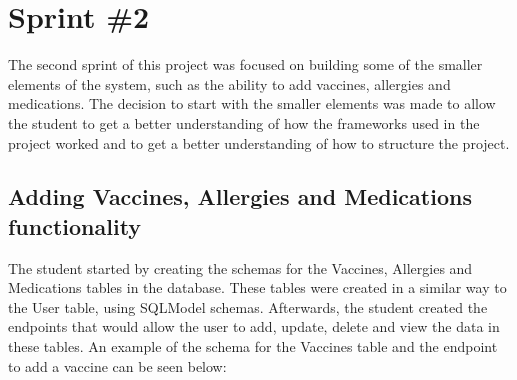 \section{Sprint \#2}

The second sprint of this project was focused on building some of the smaller elements of the system, such as the ability to add vaccines, allergies and medications. The decision to start with the smaller elements was made to allow the student to get a better understanding of how the frameworks used in the project worked and to get a better understanding of how to structure the project.

\subsection{Adding Vaccines, Allergies and Medications functionality}

The student started by creating the schemas for the Vaccines, Allergies and Medications tables in the database. These tables were created in a similar way to the User table, using SQLModel schemas. Afterwards, the student created the endpoints that would allow the user to add, update, delete and view the data in these tables. An example of the schema for the Vaccines table and the endpoint to add a vaccine can be seen below:

